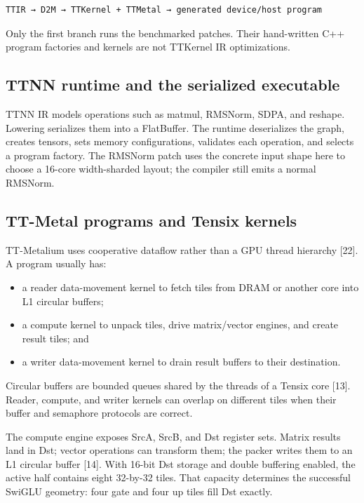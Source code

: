 \documentclass[
  10pt,
  american,
  10pt,
  letterpaper]{article}
\providecommand{\tightlist}{%
  \setlength{\itemsep}{0pt}\setlength{\parskip}{0pt}}
\begin{document}
\begin{verbatim}
TTIR → D2M → TTKernel + TTMetal → generated device/host program
\end{verbatim}

Only the first branch runs the benchmarked patches. Their hand-written
C++ program factories and kernels are not TTKernel IR optimizations.

\hypertarget{ttnn-runtime-and-the-serialized-executable}{%
\subsection{TTNN runtime and the serialized
executable}\label{ttnn-runtime-and-the-serialized-executable}}

TTNN IR models operations such as matmul, RMSNorm, SDPA, and reshape.
Lowering serializes them into a FlatBuffer. The runtime deserializes the
graph, creates tensors, sets memory configurations, validates each
operation, and selects a program factory. The RMSNorm patch uses the
concrete input shape here to choose a 16-core width-sharded layout; the
compiler still emits a normal RMSNorm.

\hypertarget{tt-metal-programs-and-tensix-kernels}{%
\subsection{TT-Metal programs and Tensix
kernels}\label{tt-metal-programs-and-tensix-kernels}}

TT-Metalium uses cooperative dataflow rather than a GPU thread hierarchy
{[}22{]}. A program usually has:

\begin{itemize}
\tightlist
\item
  a reader data-movement kernel to fetch tiles from DRAM or another core
  into L1 circular buffers;
\item
  a compute kernel to unpack tiles, drive matrix/vector engines, and
  create result tiles; and
\item
  a writer data-movement kernel to drain result buffers to their
  destination.
\end{itemize}

Circular buffers are bounded queues shared by the threads of a Tensix
core {[}13{]}. Reader, compute, and writer kernels can overlap on
different tiles when their buffer and semaphore protocols are correct.

The compute engine exposes SrcA, SrcB, and Dst register sets. Matrix
results land in Dst; vector operations can transform them; the packer
writes them to an L1 circular buffer {[}14{]}. With 16-bit Dst storage
and double buffering enabled, the active half contains eight 32-by-32
tiles. That capacity determines the successful SwiGLU geometry: four
gate and four up tiles fill Dst exactly.
\end{document}
